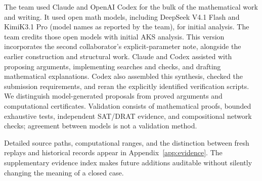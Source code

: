 \documentclass[11pt]{article}
\begin{document}
The team used Claude and OpenAI Codex for the bulk of the mathematical work and writing. It used open math models, including DeepSeek V4.1 Flash and KimiK3.1 Pro (model names as reported by the team), for initial analysis. The team credits those open models with initial AKS analysis. This version incorporates the second collaborator's explicit-parameter note, alongside the earlier construction and structural work. Claude and Codex assisted with proposing arguments, implementing searches and checks, and drafting mathematical explanations. Codex also assembled this synthesis, checked the submission requirements, and reran the explicitly identified verification scripts. We distinguish model-generated proposals from proved arguments and computational certificates. Validation consists of mathematical proofs, bounded exhaustive tests, independent SAT/DRAT evidence, and compositional network checks; agreement between models is not a validation method.

Detailed source paths, computational ranges, and the distinction between fresh replays and historical records appear in Appendix~\ref{app:evidence}. The supplementary evidence index makes future additions auditable without silently changing the meaning of a closed case.

\appendix
\end{document}
